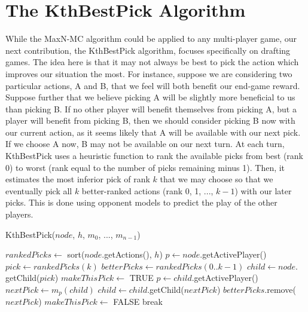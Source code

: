 \documentclass[letterpaper]{article}
\numberwithin{equation}{section}
\numberwithin{theorem}{section}
\numberwithin{lemma}{section}
\numberwithin{df}{section}
\begin{document}
 
\section{The KthBestPick Algorithm}

While the MaxN-MC algorithm could be applied to any multi-player game, our next contribution, the KthBestPick algorithm, focuses specifically on drafting games.  The idea here is that it may not always be best to pick the action which improves our situation the most.  For instance, suppose we are considering two particular actions, A and B, that we feel will both benefit our end-game reward.  Suppose further that we believe picking A will be slightly more beneficial to us than picking B.  If no other player will benefit themselves from picking A, but a player will benefit from picking B, then we should consider picking B now with our current action, as it seems likely that A will be available with our next pick.  If we choose A now, B may not be available on our next turn.  At each turn, KthBestPick uses a heuristic function to rank the available picks from best (rank 0) to worst (rank equal to the number of picks remaining minus 1).  Then, it estimates the most inferior pick of rank $k$ that we may choose so that we eventually pick all $k$ better-ranked actions (rank 0, 1, ..., $k-1$) with our later picks.  This is done using opponent models to predict the play of the other players.

\begin{algorithm}
	\caption{KthBestPick($node$, $h$, $m_0$, ..., $m_{n-1}$)}
	\label{alg:kth}
	\begin{algorithmic}[1]
		\STATE $rankedPicks \gets $ sort($node$.getActions(), $h$)
		\STATE $p \gets node$.getActivePlayer()
			\STATE $pick \gets rankedPicks(k)$
			\STATE $betterPicks \gets rankedPicks(0..k-1)$
			\STATE $child \gets node.$getChild($pick$)
			\STATE $makeThisPick \gets $ TRUE
				\STATE $p \gets child$.getActivePlayer()
				\STATE $nextPick \gets m_p(child)$
				\STATE $child \gets child.$getChild($nextPick$)
						\STATE $betterPicks.$remove($nextPick$)
					\ELSE
						\STATE $makeThisPick \gets $ FALSE
						\STATE break
					\ENDIF
				\ENDIF
			\ENDWHILE
			\ENDIF
		\ENDFOR
	\end{algorithmic}
\end{algorithm}
\end{document}
